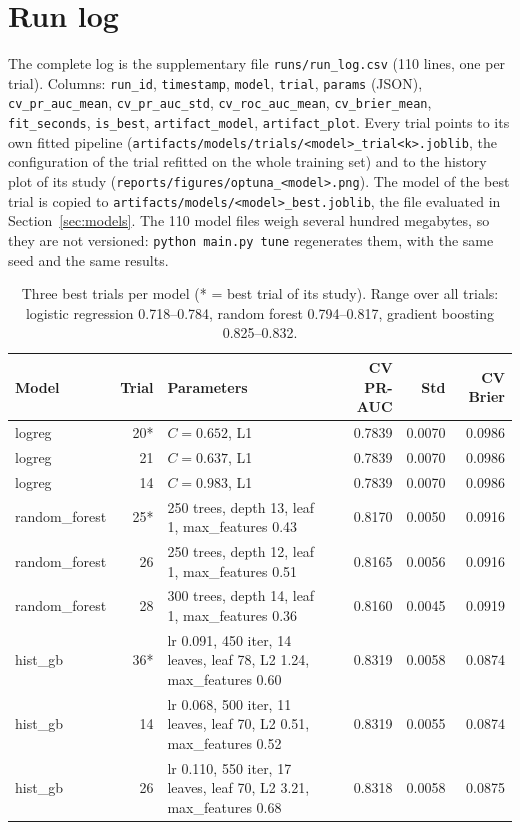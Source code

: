 \documentclass[11pt,a4paper]{article}
\newcommand{\code}[1]{\texttt{#1}}
\begin{document}
\appendix
\section{Run log}\label{app:runlog}
\begin{sloppypar}
The complete log is the supplementary file \code{runs/run\_log.csv} (110 lines, one per trial).
Columns: \code{run\_id}, \code{timestamp}, \code{model}, \code{trial}, \code{params} (JSON),
\code{cv\_pr\_auc\_mean}, \code{cv\_pr\_auc\_std}, \code{cv\_roc\_auc\_mean}, \code{cv\_brier\_mean},
\code{fit\_seconds}, \code{is\_best}, \code{artifact\_model}, \code{artifact\_plot}.
Every trial points to its own fitted pipeline
(\code{artifacts/models/trials/<model>\_trial<k>.joblib}, the configuration of the trial refitted
on the whole training set) and to the history plot of its study
(\code{reports/figures/optuna\_<model>.png}). The model of the best trial is copied to
\code{artifacts/models/<model>\_best.joblib}, the file evaluated in Section~\ref{sec:models}.
The 110 model files weigh several hundred megabytes, so they are not versioned:
\code{python main.py tune} regenerates them, with the same seed and the same results.
\end{sloppypar}

\begin{table}[H]\centering\footnotesize
\begin{tabular}{lrp{7.6cm}rrr}\toprule
Model & Trial & Parameters & CV PR-AUC & Std & CV Brier\\\midrule
logreg & 20* & $C=0.652$, L1 & 0.7839 & 0.0070 & 0.0986\\
logreg & 21 & $C=0.637$, L1 & 0.7839 & 0.0070 & 0.0986\\
logreg & 14 & $C=0.983$, L1 & 0.7839 & 0.0070 & 0.0986\\\midrule
random\_forest & 25* & 250 trees, depth 13, leaf 1, max\_features 0.43 & 0.8170 & 0.0050 & 0.0916\\
random\_forest & 26 & 250 trees, depth 12, leaf 1, max\_features 0.51 & 0.8165 & 0.0056 & 0.0916\\
random\_forest & 28 & 300 trees, depth 14, leaf 1, max\_features 0.36 & 0.8160 & 0.0045 & 0.0919\\\midrule
hist\_gb & 36* & lr 0.091, 450 iter, 14 leaves, leaf 78, L2 1.24, max\_features 0.60 & 0.8319 & 0.0058 & 0.0874\\
hist\_gb & 14 & lr 0.068, 500 iter, 11 leaves, leaf 70, L2 0.51, max\_features 0.52 & 0.8319 & 0.0055 & 0.0874\\
hist\_gb & 26 & lr 0.110, 550 iter, 17 leaves, leaf 70, L2 3.21, max\_features 0.68 & 0.8318 & 0.0058 & 0.0875\\\bottomrule
\end{tabular}
\caption{Three best trials per model (* = best trial of its study). Range over all
trials: logistic regression 0.718--0.784, random forest 0.794--0.817, gradient boosting 0.825--0.832.}
\end{table}
\end{document}
